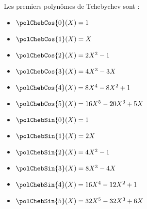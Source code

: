 \begin{example}
Les premiers polynômes de Tchebychev sont :

\begin{minipage}{0.49\linewidth}
\begin{itemize}
\item $\polChebCos{0}(X)= 1$ 
\item $\polChebCos{1}(X)= X$
\item $\polChebCos{2}(X)=2X^2-1$ 
\item $\polChebCos{3}(X)=4X^3 - 3X$
\item $\polChebCos{4}(X)=8X^4 - 8X^2 + 1$
\item $\polChebCos{5}(X)=16X^5 - 20X^3 + 5X$
\end{itemize}
\end{minipage}
\begin{minipage}{0.49\linewidth}
\begin{itemize}
\item $\polChebSin{0}(X)= 1$ 
\item $\polChebSin{1}(X)= 2X$
\item $\polChebSin{2}(X)= 4X^2 - 1$
\item $\polChebSin{3}(X)= 8X^3 - 4X$
\item $\polChebSin{4}(X)= 16X^4 - 12X^2 + 1$
\item $\polChebSin{5}(X) = 32X^5 - 32X^3 + 6X$
\end{itemize}
\end{minipage}
\end{example}